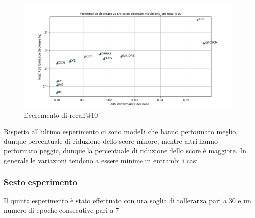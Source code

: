 \begin{figure}[H]
    \centering
     \includegraphics[width=\textwidth]{images/decrement_recall@10_movielens_1m_40_7.png}
    \caption{Decremento di recall@10}
\end{figure}

\noindent Rispetto all'ultimo esperimento ci sono modelli che hanno performato meglio, dunque percentuale di riduzione dello score minore, mentre altri hanno performato peggio, dunque la percentuale di riduzione dello score è maggiore. In generale le variazioni tendono a essere minime in entrambi i casi



\subsubsection{Sesto esperimento}

Il quinto esperimento è stato effettuato con una soglia di tolleranza pari a 30 e un numero di epoche consecutive pari a 7


